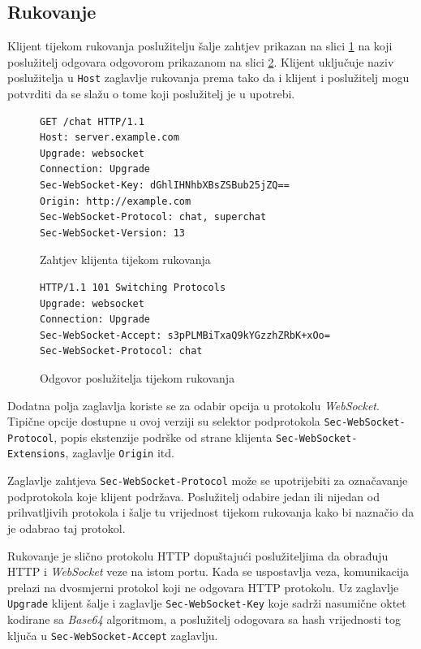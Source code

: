 \documentclass[times, utf8, zavrsni]{fer}
\begin{document}
\subsection{Rukovanje}
Klijent tijekom rukovanja poslužitelju šalje zahtjev prikazan na slici \ref{lst:websocket-rukovanje-1} na koji poslužitelj odgovara odgovorom prikazanom na slici \ref{lst:websocket-rukovanje-2}. Klijent uključuje naziv poslužitelja u {\tt Host} zaglavlje rukovanja prema tako da i klijent i poslužitelj mogu potvrditi da se slažu o tome koji poslužitelj je u upotrebi.

\begin{figure}
\begin{lstlisting}
GET /chat HTTP/1.1
Host: server.example.com
Upgrade: websocket
Connection: Upgrade
Sec-WebSocket-Key: dGhlIHNhbXBsZSBub25jZQ==
Origin: http://example.com
Sec-WebSocket-Protocol: chat, superchat
Sec-WebSocket-Version: 13
\end{lstlisting}
\caption{Zahtjev klijenta tijekom rukovanja}
\label{lst:websocket-rukovanje-1}
\end{figure}

\begin{figure}
\begin{lstlisting}
HTTP/1.1 101 Switching Protocols
Upgrade: websocket
Connection: Upgrade
Sec-WebSocket-Accept: s3pPLMBiTxaQ9kYGzzhZRbK+xOo=
Sec-WebSocket-Protocol: chat
\end{lstlisting}
\caption{Odgovor poslužitelja tijekom rukovanja}
\label{lst:websocket-rukovanje-2}
\end{figure}

Dodatna polja zaglavlja koriste se za odabir opcija u protokolu {\em WebSocket}. Tipične opcije dostupne u ovoj verziji su selektor podprotokola {\tt Sec-WebSocket-Protocol}, popis ekstenzije podrške od strane klijenta {\tt Sec-WebSocket-Extensions}, zaglavlje {\tt Origin} itd. 

Zaglavlje zahtjeva {\tt Sec-WebSocket-Protocol} može se upotrijebiti za označavanje podprotokola koje klijent podržava. Poslužitelj odabire jedan ili nijedan od prihvatljivih protokola i šalje tu vrijednost tijekom rukovanja kako bi naznačio da je odabrao taj protokol.

Rukovanje je slično protokolu HTTP dopuštajući poslužiteljima da obrađuju HTTP i {\em WebSocket} veze na istom portu. Kada se uspostavlja veza, komunikacija prelazi na dvosmjerni protokol koji ne odgovara HTTP protokolu. Uz zaglavlje {\tt Upgrade} klijent šalje i zaglavlje {\tt Sec-WebSocket-Key} koje sadrži nasumične oktet kodirane sa {\em Base64} algoritmom, a poslužitelj odogovara sa hash vrijednosti tog ključa u {\tt Sec-WebSocket-Accept} zaglavlju.
\end{document}
